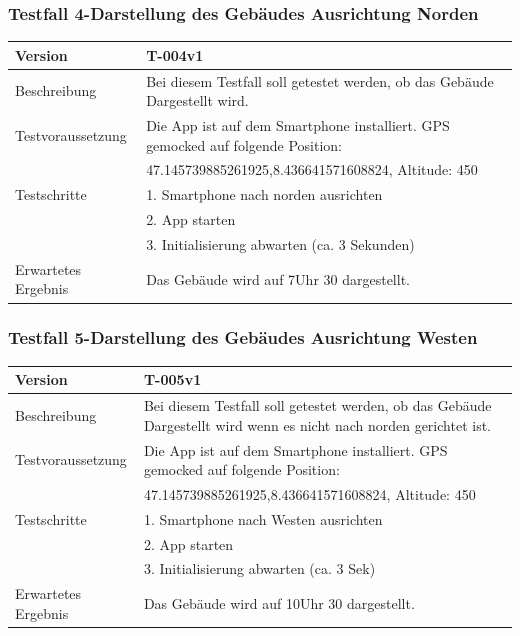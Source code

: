 \documentclass[a4paper]{scrreprt}
\begin{document}
\subsubsection{Testfall 4-Darstellung des Gebäudes Ausrichtung Norden}
\begin{tabularx}{\textwidth}{|l|X|}
\hline 
	Version &
	T-004v1 \\ 
\hline 
	Beschreibung & 
	Bei diesem Testfall soll getestet werden, ob das Gebäude Dargestellt wird.\\ 
\hline 
	Testvoraussetzung &
	Die App ist auf dem Smartphone installiert. GPS gemocked auf folgende Position: \\ & 
		47.145739885261925,8.436641571608824, Altitude: 450 \\ 
\hline 
	Testschritte & 
		1. Smartphone nach norden ausrichten \\ &
		2. App starten \\ &
		3. Initialisierung abwarten (ca. 3 Sekunden)\\
\hline
	Erwartetes Ergebnis &
	Das Gebäude wird auf 7Uhr 30 dargestellt. \\ 
\hline 
\end{tabularx}
\subsubsection{Testfall 5-Darstellung des Gebäudes Ausrichtung Westen}
\begin{tabularx}{\textwidth}{|l|X|}
\hline 
	Version &
	T-005v1 \\ 
\hline 
	Beschreibung & 
	Bei diesem Testfall soll getestet werden, ob das Gebäude Dargestellt wird wenn es nicht nach norden gerichtet ist. \\ 
\hline 
	Testvoraussetzung &
	Die App ist auf dem Smartphone installiert. GPS gemocked auf folgende Position: \\ &
		47.145739885261925,8.436641571608824, Altitude: 450 \\ 
\hline 
	Testschritte & 
		1. Smartphone nach Westen ausrichten \\ &
		2. App starten \\ &
		3. Initialisierung abwarten (ca. 3 Sek) \\
\hline
	Erwartetes Ergebnis &
	Das Gebäude wird auf 10Uhr 30 dargestellt. \\ 
\hline 
\end{tabularx}
\end{document}
